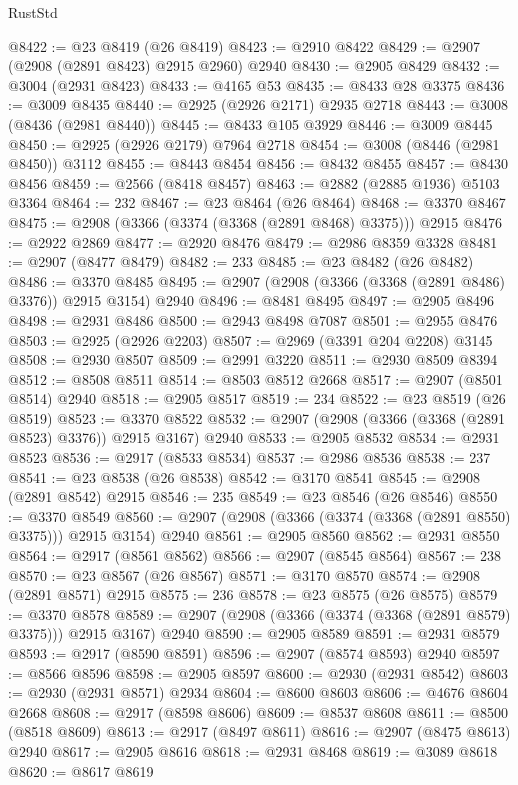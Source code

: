 \begin{lexlean}{RustStd}
\begin{coremodule}
@8422 := @23 @8419 (@26 @8419)
@8423 := @2910 @8422
@8429 := @2907 (@2908 (@2891 @8423) @2915 @2960) @2940
@8430 := @2905 @8429
@8432 := @3004 (@2931 @8423)
@8433 := @4165 @53
@8435 := @8433 @28 @3375
@8436 := @3009 @8435
@8440 := @2925 (@2926 @2171) @2935 @2718
@8443 := @3008 (@8436 (@2981 @8440))
@8445 := @8433 @105 @3929
@8446 := @3009 @8445
@8450 := @2925 (@2926 @2179) @7964 @2718
@8454 := @3008 (@8446 (@2981 @8450)) @3112
@8455 := @8443 @8454
@8456 := @8432 @8455
@8457 := @8430 @8456
@8459 := @2566 (@8418 @8457)
@8463 := @2882 (@2885 @1936) @5103 @3364
@8464 := 232
@8467 := @23 @8464 (@26 @8464)
@8468 := @3370 @8467
@8475 := @2908 (@3366 (@3374 (@3368 (@2891 @8468) @3375))) @2915
@8476 := @2922 @2869
@8477 := @2920 @8476
@8479 := @2986 @8359 @3328
@8481 := @2907 (@8477 @8479)
@8482 := 233
@8485 := @23 @8482 (@26 @8482)
@8486 := @3370 @8485
@8495 := @2907 (@2908 (@3366 (@3368 (@2891 @8486) @3376)) @2915 @3154) @2940
@8496 := @8481 @8495
@8497 := @2905 @8496
@8498 := @2931 @8486
@8500 := @2943 @8498 @7087
@8501 := @2955 @8476
@8503 := @2925 (@2926 @2203)
@8507 := @2969 (@3391 @204 @2208) @3145
@8508 := @2930 @8507
@8509 := @2991 @3220
@8511 := @2930 @8509 @8394
@8512 := @8508 @8511
@8514 := @8503 @8512 @2668
@8517 := @2907 (@8501 @8514) @2940
@8518 := @2905 @8517
@8519 := 234
@8522 := @23 @8519 (@26 @8519)
@8523 := @3370 @8522
@8532 := @2907 (@2908 (@3366 (@3368 (@2891 @8523) @3376)) @2915 @3167) @2940
@8533 := @2905 @8532
@8534 := @2931 @8523
@8536 := @2917 (@8533 @8534)
@8537 := @2986 @8536
@8538 := 237
@8541 := @23 @8538 (@26 @8538)
@8542 := @3170 @8541
@8545 := @2908 (@2891 @8542) @2915
@8546 := 235
@8549 := @23 @8546 (@26 @8546)
@8550 := @3370 @8549
@8560 := @2907 (@2908 (@3366 (@3374 (@3368 (@2891 @8550) @3375))) @2915 @3154) @2940
@8561 := @2905 @8560
@8562 := @2931 @8550
@8564 := @2917 (@8561 @8562)
@8566 := @2907 (@8545 @8564)
@8567 := 238
@8570 := @23 @8567 (@26 @8567)
@8571 := @3170 @8570
@8574 := @2908 (@2891 @8571) @2915
@8575 := 236
@8578 := @23 @8575 (@26 @8575)
@8579 := @3370 @8578
@8589 := @2907 (@2908 (@3366 (@3374 (@3368 (@2891 @8579) @3375))) @2915 @3167) @2940
@8590 := @2905 @8589
@8591 := @2931 @8579
@8593 := @2917 (@8590 @8591)
@8596 := @2907 (@8574 @8593) @2940
@8597 := @8566 @8596
@8598 := @2905 @8597
@8600 := @2930 (@2931 @8542)
@8603 := @2930 (@2931 @8571) @2934
@8604 := @8600 @8603
@8606 := @4676 @8604 @2668
@8608 := @2917 (@8598 @8606)
@8609 := @8537 @8608
@8611 := @8500 (@8518 @8609)
@8613 := @2917 (@8497 @8611)
@8616 := @2907 (@8475 @8613) @2940
@8617 := @2905 @8616
@8618 := @2931 @8468
@8619 := @3089 @8618
@8620 := @8617 @8619

\end{coremodule}
\end{lexlean}
